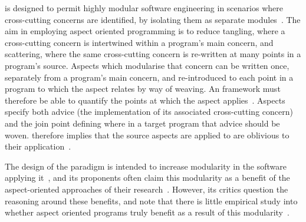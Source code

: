
\Aop{} is designed to permit highly modular software
engineering in scenarios where cross-cutting concerns are identified, by
isolating them as separate modules~\cite{kiczales1997aspect}. The aim in
employing aspect oriented programming is to reduce tangling, where a
cross-cutting concern is intertwined within a program's main concern, and
scattering, where the same cross-cutting concern is re-written at many points in
a program's source. Aspects which modularise that concern can be written once,
separately from a program's main concern, and re-introduced to each point in a
program to which the aspect relates by way of weaving. An \aspectorientation{}
framework must therefore be able to quantify the points at which the aspect
applies~\cite{filman2000aspect}. Aspects specify both advice (the implementation
of its associated cross-cutting concern) and the join point defining where in a
target program that advice should be woven. \Aspectorientation{} therefore implies
that the source aspects are applied to are oblivious to their
application~\cite{filman2000aspect}.

The design of the paradigm is intended to increase modularity in the software
applying it~\cite{kiczales1997aspect,filman2000aspect,przybylek2018empirical},
and its proponents often claim this modularity as a benefit of the
aspect-oriented approaches of their
research~\cite{gilani2004family,charfi2007ao4bpel,Cappelli_AOBPM,jalali2012aspect,chibani2013toward}.
However, its critics question the reasoning around these benefits, and note that
there is little empirical study into whether aspect oriented programs truly
benefit as a result of this
modularity~\cite{Constantinides04aopconsidered,steimann06paradoxical,przybylek2010wrong,przybylek2018empirical}.

